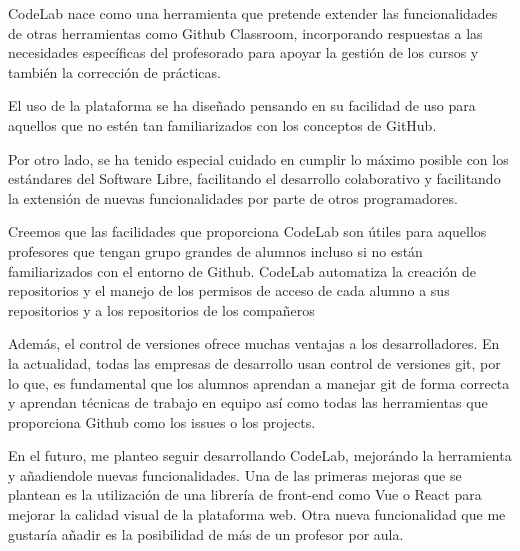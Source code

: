 

CodeLab nace como una herramienta que pretende extender las funcionalidades
de otras herramientas como Github Classroom, incorporando respuestas a las necesidades 
específicas del profesorado para apoyar la gestión de los cursos y
también la corrección de prácticas.

El uso de la plataforma se ha diseñado pensando en su facilidad de
uso para aquellos que no estén tan familiarizados con los conceptos
de GitHub. 

Por otro lado, se ha tenido especial cuidado en cumplir lo máximo
posible con los estándares del Software Libre,
facilitando el desarrollo colaborativo y facilitando 
la extensión de nuevas funcionalidades por parte de otros programadores.

Creemos que las facilidades que proporciona CodeLab son
útiles para aquellos profesores que tengan grupo grandes de
alumnos incluso si no están familiarizados con el entorno de Github.
CodeLab automatiza la creación de repositorios y el manejo
de los permisos de acceso de cada alumno a sus repositorios y a los
repositorios de los compañeros

Además, el control de versiones ofrece muchas ventajas a los
desarrolladores. En la actualidad, todas las empresas de desarrollo
usan control de versiones git, por lo que, es fundamental que los
alumnos aprendan a manejar git de forma correcta y aprendan técnicas
de trabajo en equipo así como todas las herramientas que proporciona
Github como los issues o los projects.

En el futuro, me planteo seguir desarrollando CodeLab, mejorándo la herramienta
y añadiendole nuevas funcionalidades. 
Una de las primeras mejoras
que se plantean es la utilización de una librería de front-end como
Vue o React para mejorar la calidad visual de la plataforma web.
Otra nueva funcionalidad que me gustaría añadir es la posibilidad
de más de un profesor por aula.
